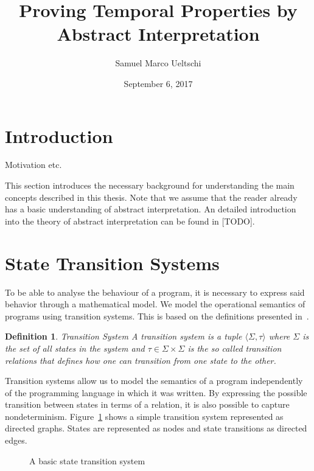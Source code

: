 \documentclass[11pt,a4paper,titlepage]{article}
\title{Proving Temporal Properties by Abstract Interpretation}
\date{September 6, 2017}
\author{Samuel Marco Ueltschi}
\newtheorem{definition}{Definition}[section]
\begin{document}
\maketitle

\tableofcontents
\clearpage

\section{Introduction}
 
Motivation etc.

This section introduces the necessary background for understanding the main concepts described in this thesis.
Note that we assume that the reader already has a basic understanding of abstract interpretation. An detailed introduction into 
the theory of abstract interpretation can be found in [TODO].


\section{State Transition Systems}

To be able to analyse the behaviour of a program, it is necessary 
to express said behavior through a mathematical model. 
We model the operational semantics of programs using transition systems. 
This is based on the definitions presented in~\cite{UrbanM-VMCAI15}.

\begin{definition}{Transition System}
    A transition system is a tuple $\langle \Sigma, \tau \rangle$ where $\Sigma$ 
    is the set of all states in the system and $\tau \in \Sigma \times \Sigma$ 
    is the so called transition relations that defines how one can transition from one state to the other.
\end{definition}

Transition systems allow us to model the semantics of a program 
independently of the programming language in which it was written. 
By expressing the possible transition between states in terms of a relation, 
it is also possible to capture nondeterminism. Figure~\ref{fig:basic_transition_system} 
shows a simple transition system represented as directed graphs. States are represented as nodes
and state transitions as directed edges.
\\

\begin{figure}
\centering
{}
\caption{A basic state transition system} 
\label{fig:basic_transition_system}
\end{figure}
\end{document}
